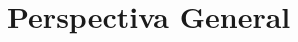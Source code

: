 \documentclass[twoside]{Plantilla}
\begin{document}
\begin{titlepage}

\end{titlepage}



\newpage
\tableofcontents
\newpage

\pagestyle{insection}
\section{Perspectiva General}


\newpage

\end{document}
